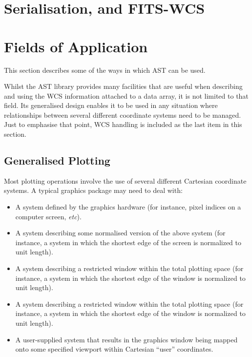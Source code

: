 \documentclass[final,authoryear,5p,times,twocolumn]{elsarticle}
\begin{document}
\section{Serialisation, and FITS-WCS}

\section{Fields of Application}
This section describes some of the ways in which AST can be used.

Whilst the AST library provides many facilities that are useful when
describing and using the WCS information attached to a data array, it
is not limited to that field. Its generalised design enables it to be used
in any situation where relationships between several different coordinate
systems need to be managed. Just to emphasise that point, WCS handling is
included as the last item in this section.

\subsection{Generalised Plotting}

Most plotting operations involve the use of several different Cartesian
coordinate systems. A typical graphics package may need to deal with:

\begin{itemize}
\item A system defined by the graphics hardware (for instance, pixel indices
on a computer screen, \emph{etc}).

\item A system describing some normalised version of the above system (for
instance, a system in which the shortest edge of the screen is normalized
to unit length).

\item A system describing a restricted window within the total plotting space
(for instance, a system in which the shortest edge of the window is normalized
to unit length).

\item A system describing a restricted window within the total plotting space
(for instance, a system in which the shortest edge of the window is normalized
to unit length).

\item A user-supplied system that results in the graphics window being mapped
onto some specified viewport within Cartesian ``user'' coordinates.

\end{itemize}
\end{document}
